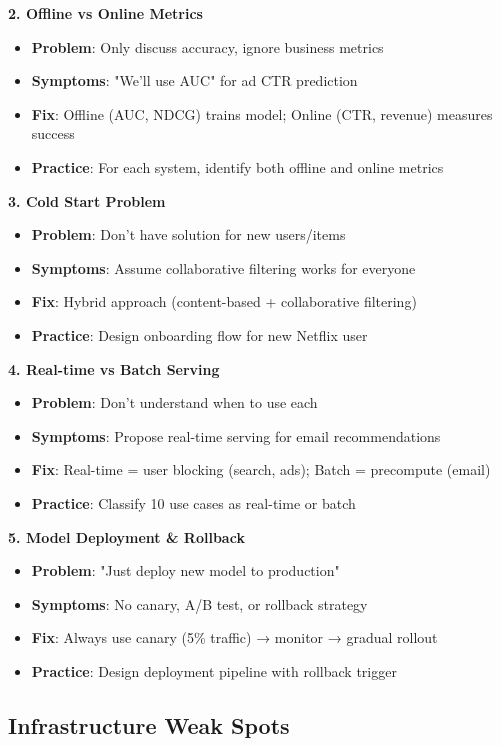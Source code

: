 \documentclass[10pt]{article}
\begin{document}
\textbf{2. Offline vs Online Metrics}
\begin{itemize}
\item \textbf{Problem}: Only discuss accuracy, ignore business metrics
\item \textbf{Symptoms}: "We'll use AUC" for ad CTR prediction
\item \textbf{Fix}: Offline (AUC, NDCG) trains model; Online (CTR, revenue) measures success
\item \textbf{Practice}: For each system, identify both offline and online metrics
\end{itemize}

\textbf{3. Cold Start Problem}
\begin{itemize}
\item \textbf{Problem}: Don't have solution for new users/items
\item \textbf{Symptoms}: Assume collaborative filtering works for everyone
\item \textbf{Fix}: Hybrid approach (content-based + collaborative filtering)
\item \textbf{Practice}: Design onboarding flow for new Netflix user
\end{itemize}

\textbf{4. Real-time vs Batch Serving}
\begin{itemize}
\item \textbf{Problem}: Don't understand when to use each
\item \textbf{Symptoms}: Propose real-time serving for email recommendations
\item \textbf{Fix}: Real-time = user blocking (search, ads); Batch = precompute (email)
\item \textbf{Practice}: Classify 10 use cases as real-time or batch
\end{itemize}

\textbf{5. Model Deployment \& Rollback}
\begin{itemize}
\item \textbf{Problem}: "Just deploy new model to production"
\item \textbf{Symptoms}: No canary, A/B test, or rollback strategy
\item \textbf{Fix}: Always use canary (5\% traffic) → monitor → gradual rollout
\item \textbf{Practice}: Design deployment pipeline with rollback trigger
\end{itemize}

\subsection{Infrastructure Weak Spots}
\end{document}
